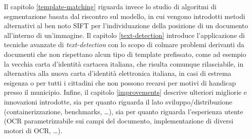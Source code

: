 Il capitolo \ref{template-matching} riguarda invece lo studio di algoritmi di segmentazione basata dal riscontro sul modello, in cui vengono introdotti metodi alternativi al ben noto SIFT per l'individuazione della posizione di un documento all'interno di un'immagine. Il capitolo \ref{text-detection} introduce l'applicazione di tecniche avanzate di \textit{text-detection} con lo scopo di colmare problemi derivanti da documenti che non rispettano alcun tipo di template prefissato, come ad esempio la vecchia carta d'identit\`a cartacea italiana, che risulta comunque rilasciabile, in alternativa alla nuova carta d'identit\`a elettronica italiana, in casi di estrema esigenza o per tutti i cittadini che non possono recarsi per motivi di handicap presso il municipio. Infine, il capitolo \ref{improvements} descrive ulteriori migliorie e innovazioni introdotte, sia per quanto riguarda il lato sviluppo/distribuzione (containerizzazione, benchmarks, \dots), sia per quanto riguarda l'esperienza utente (OCR parametrizzabile sui campi del documento, implementazione di diversi motori di OCR, \dots).

